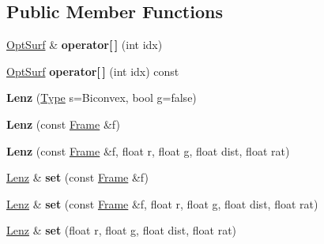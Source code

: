 \subsection*{Public Member Functions}
\begin{DoxyCompactItemize}
\item 
\hypertarget{structvsr_1_1_lenz_af1707a80e536148993ff9cb504634eab}{\hyperlink{structvsr_1_1_opt_surf}{Opt\-Surf} \& {\bfseries operator\mbox{[}$\,$\mbox{]}} (int idx)}\label{structvsr_1_1_lenz_af1707a80e536148993ff9cb504634eab}

\item 
\hypertarget{structvsr_1_1_lenz_a0675e6ce66b51267e76955e088bcc3ac}{\hyperlink{structvsr_1_1_opt_surf}{Opt\-Surf} {\bfseries operator\mbox{[}$\,$\mbox{]}} (int idx) const }\label{structvsr_1_1_lenz_a0675e6ce66b51267e76955e088bcc3ac}

\item 
\hypertarget{structvsr_1_1_lenz_a5a07998514c7a46aa96518a1e071a9c3}{{\bfseries Lenz} (\hyperlink{structvsr_1_1_lenz_acf6ae241e35039b0dbda7b4f03ae095c}{Type} s=Biconvex, bool g=false)}\label{structvsr_1_1_lenz_a5a07998514c7a46aa96518a1e071a9c3}

\item 
\hypertarget{structvsr_1_1_lenz_a1052ef8713265084a659597d6b0c58ad}{{\bfseries Lenz} (const \hyperlink{classvsr_1_1_frame}{Frame} \&f)}\label{structvsr_1_1_lenz_a1052ef8713265084a659597d6b0c58ad}

\item 
\hypertarget{structvsr_1_1_lenz_a726b027b50087f236d232931ef37470c}{{\bfseries Lenz} (const \hyperlink{classvsr_1_1_frame}{Frame} \&f, float r, float g, float dist, float rat)}\label{structvsr_1_1_lenz_a726b027b50087f236d232931ef37470c}

\item 
\hypertarget{structvsr_1_1_lenz_a2c1103df477d02665688a1b69a3897aa}{\hyperlink{structvsr_1_1_lenz}{Lenz} \& {\bfseries set} (const \hyperlink{classvsr_1_1_frame}{Frame} \&f)}\label{structvsr_1_1_lenz_a2c1103df477d02665688a1b69a3897aa}

\item 
\hypertarget{structvsr_1_1_lenz_ab760fbb1c846d5d3bf0d691997e89b67}{\hyperlink{structvsr_1_1_lenz}{Lenz} \& {\bfseries set} (const \hyperlink{classvsr_1_1_frame}{Frame} \&f, float r, float g, float dist, float rat)}\label{structvsr_1_1_lenz_ab760fbb1c846d5d3bf0d691997e89b67}

\item 
\hypertarget{structvsr_1_1_lenz_af2806107bfb170d71857a89a46369aeb}{\hyperlink{structvsr_1_1_lenz}{Lenz} \& {\bfseries set} (float r, float g, float dist, float rat)}\label{structvsr_1_1_lenz_af2806107bfb170d71857a89a46369aeb}


\end{DoxyCompactItemize}
